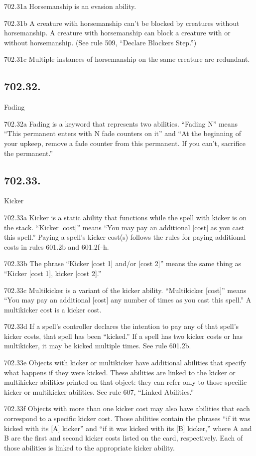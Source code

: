 702.31a Horsemanship is an evasion ability.

702.31b A creature with horsemanship can’t be blocked by creatures without horsemanship. A creature with horsemanship can block a creature with or without horsemanship. (See rule 509, “Declare Blockers Step.”)

702.31c Multiple instances of horsemanship on the same creature are redundant.

\subsection*{702.32.}
Fading

702.32a Fading is a keyword that represents two abilities. “Fading N” means “This permanent enters with N fade counters on it” and “At the beginning of your upkeep, remove a fade counter from this permanent. If you can’t, sacrifice the permanent.”

\subsection*{702.33.}
Kicker

702.33a Kicker is a static ability that functions while the spell with kicker is on the stack. “Kicker [cost]” means “You may pay an additional [cost] as you cast this spell.” Paying a spell’s kicker cost(s) follows the rules for paying additional costs in rules 601.2b and 601.2f–h.

702.33b The phrase “Kicker [cost 1] and/or [cost 2]” means the same thing as “Kicker [cost 1], kicker [cost 2].”

702.33c Multikicker is a variant of the kicker ability. “Multikicker [cost]” means “You may pay an additional [cost] any number of times as you cast this spell.” A multikicker cost is a kicker cost.

702.33d If a spell’s controller declares the intention to pay any of that spell’s kicker costs, that spell has been “kicked.” If a spell has two kicker costs or has multikicker, it may be kicked multiple times. See rule 601.2b.

702.33e Objects with kicker or multikicker have additional abilities that specify what happens if they were kicked. These abilities are linked to the kicker or multikicker abilities printed on that object: they can refer only to those specific kicker or multikicker abilities. See rule 607, “Linked Abilities.”

702.33f Objects with more than one kicker cost may also have abilities that each correspond to a specific kicker cost. Those abilities contain the phrases “if it was kicked with its [A] kicker” and “if it was kicked with its [B] kicker,” where A and B are the first and second kicker costs listed on the card, respectively. Each of those abilities is linked to the appropriate kicker ability.

